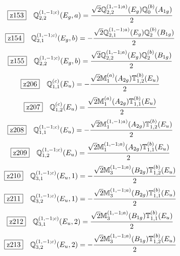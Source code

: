 \documentclass[fleqn,10pt,landscape]{jsarticle}
\begin{document}
\begin{dmath*}
\hspace*{3mm}\fbox{z153}\quad \mathbb{Q}_{2,2}^{(1,-1;c)}(E_{g},a)=\frac{\sqrt{2} \mathbb{Q}_{2,2}^{(1,-1;a)}(E_{g}) \mathbb{Q}_{0}^{(b)}(A_{1g})}{2}
\end{dmath*}
\begin{dmath*}
\hspace*{3mm}\fbox{z154}\quad \mathbb{Q}_{2,1}^{(1,-1;c)}(E_{g},b)=- \frac{\sqrt{2} \mathbb{Q}_{2,1}^{(1,-1;a)}(E_{g}) \mathbb{Q}_{2}^{(b)}(B_{1g})}{2}
\end{dmath*}
\begin{dmath*}
\hspace*{3mm}\fbox{z155}\quad \mathbb{Q}_{2,2}^{(1,-1;c)}(E_{g},b)=\frac{\sqrt{2} \mathbb{Q}_{2,2}^{(1,-1;a)}(E_{g}) \mathbb{Q}_{2}^{(b)}(B_{1g})}{2}
\end{dmath*}
\begin{dmath*}
\hspace*{3mm}\fbox{z206}\quad \mathbb{Q}_{1,1}^{(c)}(E_{u})=- \frac{\sqrt{2} \mathbb{M}_{1}^{(a)}(A_{2g}) \mathbb{T}_{1,2}^{(b)}(E_{u})}{2}
\end{dmath*}
\begin{dmath*}
\hspace*{3mm}\fbox{z207}\quad \mathbb{Q}_{1,2}^{(c)}(E_{u})=\frac{\sqrt{2} \mathbb{M}_{1}^{(a)}(A_{2g}) \mathbb{T}_{1,1}^{(b)}(E_{u})}{2}
\end{dmath*}
\begin{dmath*}
\hspace*{3mm}\fbox{z208}\quad \mathbb{Q}_{1,1}^{(1,-1;c)}(E_{u})=- \frac{\sqrt{2} \mathbb{M}_{1}^{(1,-1;a)}(A_{2g}) \mathbb{T}_{1,2}^{(b)}(E_{u})}{2}
\end{dmath*}
\begin{dmath*}
\hspace*{3mm}\fbox{z209}\quad \mathbb{Q}_{1,2}^{(1,-1;c)}(E_{u})=\frac{\sqrt{2} \mathbb{M}_{1}^{(1,-1;a)}(A_{2g}) \mathbb{T}_{1,1}^{(b)}(E_{u})}{2}
\end{dmath*}
\begin{dmath*}
\hspace*{3mm}\fbox{z210}\quad \mathbb{Q}_{3,1}^{(1,-1;c)}(E_{u},1)=- \frac{\sqrt{2} \mathbb{M}_{3}^{(1,-1;a)}(B_{2g}) \mathbb{T}_{1,2}^{(b)}(E_{u})}{2}
\end{dmath*}
\begin{dmath*}
\hspace*{3mm}\fbox{z211}\quad \mathbb{Q}_{3,2}^{(1,-1;c)}(E_{u},1)=- \frac{\sqrt{2} \mathbb{M}_{3}^{(1,-1;a)}(B_{2g}) \mathbb{T}_{1,1}^{(b)}(E_{u})}{2}
\end{dmath*}
\begin{dmath*}
\hspace*{3mm}\fbox{z212}\quad \mathbb{Q}_{3,1}^{(1,-1;c)}(E_{u},2)=\frac{\sqrt{2} \mathbb{M}_{3}^{(1,-1;a)}(B_{1g}) \mathbb{T}_{1,1}^{(b)}(E_{u})}{2}
\end{dmath*}
\begin{dmath*}
\hspace*{3mm}\fbox{z213}\quad \mathbb{Q}_{3,2}^{(1,-1;c)}(E_{u},2)=- \frac{\sqrt{2} \mathbb{M}_{3}^{(1,-1;a)}(B_{1g}) \mathbb{T}_{1,2}^{(b)}(E_{u})}{2}
\end{dmath*}
\vspace{5mm}
\end{document}
